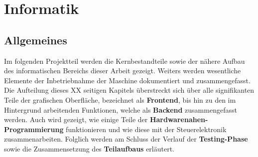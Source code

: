 \chapter{Informatik}\label{ch:informatik}

\section{Allgemeines}\label{sec:einleitung}
Im folgenden Projektteil werden die Kernbestandteile sowie der nähere Aufbau des informatischen Bereichs dieser Arbeit gezeigt.
Weiters werden wesentliche Elemente der Inbetriebnahme der Maschine dokumentiert und zusammengefasst.
Die Aufteilung dieses XX seitigen Kapitels überstreckt sich über alle signifikanten Teile der grafischen Oberfläche, bezeichnet als \textbf{Frontend}, bis hin zu den im Hintergrund arbeitenden Funktionen, welche als \textbf{Backend} zusammengefasst werden.
Auch wird gezeigt, wie einige Teile der \textbf{Hardwarenahen-Programmierung} funktionieren und wie diese mit der Steuerelektronik zusammenarbeiten.
Folglich werden am Schluss der Verlauf der \textbf{Testing-Phase} sowie die Zusammensetzung des \textbf{Teilaufbaus} erläutert.

